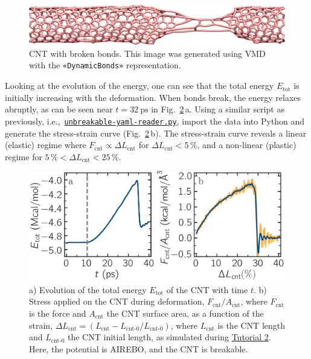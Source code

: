 \documentclass[9pt,tutorial]{livecoms}
\newcommand{\guicmd}[1]{\textcolor{command}{\texttt{«#1»}}} %
\newcommand{\dwlcmd}[1]{\textcolor{download}{\texttt{#1}}} %
\newcommand{\filepath}{https://raw.githubusercontent.com/lammpstutorials/lammpstutorials-article/main/files/}
\begin{document}
\begin{figure}
\centering
\includegraphics[width=\linewidth]{CNT-deformed-breakable}
\caption{CNT with broken bonds.  This image was generated using
VMD~\cite{vmd_home,humphrey1996vmd} with the \guicmd{DynamicBonds} representation.}
\label{fig:CNT-deformed-breakable}
\end{figure}

Looking at the evolution of the energy, one can see that the total
energy $E_\text{tot}$ is initially increasing with the deformation.  When
bonds break, the energy relaxes abruptly, as can be seen near $t=32~\text{ps}$ in Fig.~\ref{fig:CNT-breakable-energy-stress}\,a.
Using a similar script as previously,
i.e.,~\href{\filepath tutorial2/unbreakable-yaml-reader.py}{\dwlcmd{unbreakable-yaml-reader.py}},
import the data into Python and generate the stress-strain curve (Fig.~\ref{fig:CNT-breakable-energy-stress}\,b).  The 
stress-strain curve reveals a linear (elastic) regime where $F_\text{cnt} \propto \Delta L_\text{cnt}$
for $\Delta L_\text{cnt} < 5\,\%$, and a non-linear (plastic) regime
for $5\,\% < \Delta L_\text{cnt} < 25\,\%$.

\begin{figure}
\centering
\includegraphics[width=\linewidth]{CNT-breakable-stress-energy}
\caption{a) Evolution of the total energy $E_\text{tot}$ of the CNT with time $t$.
b) Stress applied on the CNT during deformation, $F_\text{cnt}/A_\text{cnt}$,
where $F_\text{cnt}$ is the force and $A_\text{cnt}$ the CNT surface area,
as a function of the strain, $\Delta L_\text{cnt} = (L_\text{cnt}-L_\text{cnt-0}/L_\text{cnt-0})$, where
$L_\text{cnt}$ is the CNT length and $L_\text{cnt-0}$ the CNT initial length,
as simulated during \hyperref[carbon-nanotube-label]{Tutorial 2}.
Here, the potential is AIREBO, and the CNT is breakable.}
\label{fig:CNT-breakable-energy-stress}
\end{figure}
\end{document}
